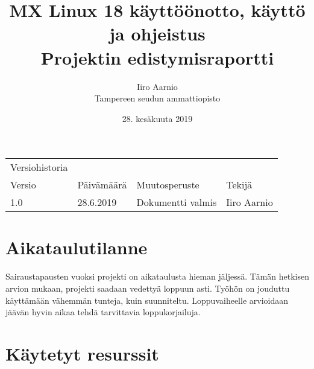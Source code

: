 \documentclass[a4paper, 12pt, finnish]{article}
\title{MX Linux 18 käyttöönotto, käyttö ja ohjeistus \\ \large Projektin edistymisraportti} %
\author{Iiro Aarnio \\ Tampereen seudun ammattiopisto \date{28. kesäkuuta 2019}}
\begin{document}
\maketitle
\thispagestyle{empty} %

\newpage
\thispagestyle{empty}
\begin{table}[htpb]
	\begin{tabular}{llll}
		Versiohistoria &            &                         &             \\
		\rowcolor[HTML]{FFCCC9}
		Versio         & Päivämäärä & Muutosperuste           & Tekijä      \\
		1.0              & 28.6.2019   & Dokumentti valmis       & Iiro Aarnio \\
	\end{tabular}
\end{table}


\newpage
\thispagestyle{empty} %

\tableofcontents

\newpage
{} %

\setcounter{page}{1} %
\newpage
\section{Aikataulutilanne}
Sairaustapausten vuoksi projekti on aikataulusta hieman jäljessä. Tämän hetkisen arvion mukaan, projekti saadaan vedettyä loppuun asti. Työhön on jouduttu käyttämään vähemmän tunteja, kuin suunniteltu. Loppuvaiheelle arvioidaan jäävän hyvin aikaa tehdä tarvittavia loppukorjailuja.

\section{Käytetyt resurssit}
\end{document}
